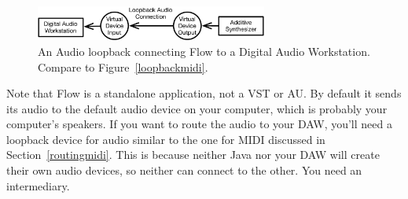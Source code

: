 \documentclass{article}
\newcommand\name{Flow}
\begin{document}
\begin{figure}
\vspace{-3em}
\begin{center}\vspace{-2em}\includegraphics[width=3in]{loopbackaudio}\end{center}
\vspace{-1em}
\caption{An Audio loopback connecting {\name} to a Digital Audio Workstation.  Compare to Figure~\ref{loopbackmidi}.}\label{loopbackaudio}
\end{figure}

Note that {\name} is a standalone application, not a VST or AU.  By default it sends its audio to the default audio device on your computer, which is probably your computer's speakers.  If you want to route the audio to your DAW, you'll need a loopback device for audio similar to the one for MIDI discussed in Section~\ref{routingmidi}.  This is because neither Java nor your DAW will create their own audio devices, so neither can connect to the other.  You need an intermediary.
\end{document}
